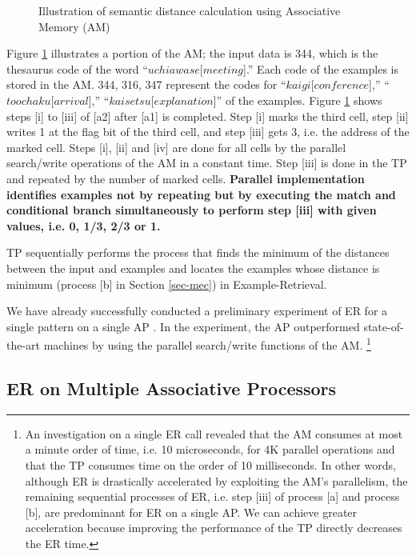 \begin{figure}[htb]
  \begin{center}
    \caption{Illustration of  semantic distance calculation using
      Associative Memory (AM)}
    \label{fig-cam-example-e}
  \end{center}
\end{figure}

Figure \ref{fig-cam-example-e} illustrates a portion of the AM;
the input data is 344, which is 
the thesaurus code of the word ``$uchiawase$[$meeting$].''
Each code of the examples is stored in the AM.
344, 316, 347 represent the codes for ``$kaigi$[$conference$],''
``$toochaku$[$arrival$],'' ``$kaisetsu$[$explanation$]'' of the
examples. 
Figure \ref{fig-cam-example-e} shows steps [i] to [iii] of [a2] 
after [a1] is  completed.
Step [i] marks the third cell, step 
[ii] writes 1  at the flag bit of the third cell,
and step [iii] gets 3, i.e. the address of the marked cell.
Steps [i], [ii] and [iv] are 
done for all cells by the parallel search/write operations
of the AM in a constant time.
Step [iii] is done in the 
TP and repeated 
by the number of marked cells.
{\bf Parallel implementation identifies examples not by
repeating but by executing the match and conditional branch simultaneously 
to perform step [iii]
with given values, i.e.  0, 1/3, 2/3 or 1.}

TP sequentially performs the process that finds the minimum of the distances 
between the input and examples and locates 
the examples whose distance is minimum (process [b] in Section 
\ref{sec-mec}) in Example-Retrieval.

We have already successfully conducted a preliminary experiment of ER 
for a single pattern on a single AP \cite{Sumita93b}. 
In the experiment, the AP outperformed state-of-the-art machines by
using the parallel search/write functions of the AM.
\footnote{
An investigation on a single ER call revealed that the 
AM consumes 
at most a minute order of time, i.e.  10 microseconds,
for 4K parallel operations and that
the TP consumes time on the order of 10 milliseconds. 
In other words, although ER is drastically accelerated by exploiting the 
AM's parallelism,
the remaining sequential processes  
of ER, i.e.  step [iii] of process [a] and process [b],
are predominant for ER on a single AP. 
We can achieve greater acceleration because 
improving the performance of the TP directly decreases the ER time.}

\subsection{ER on Multiple Associative Processors}\label{sec-config-mptdmt}

